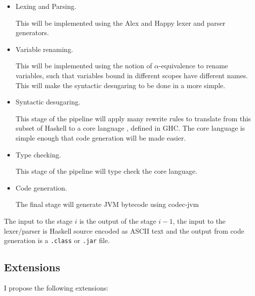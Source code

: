 \documentclass[a4paper]{article}
\begin{document}
  \begin{itemize}
    \item Lexing and Parsing.

      This will be implemented using the Alex and Happy lexer and parser generators.
    \item Variable renaming.

      This will be implemented using the notion of $\alpha$-equivalence to rename variables, such that variables bound in different scopes have different names.
      This will make the syntactic desugaring to be done in a more simple.
    \item Syntactic desugaring.

      This stage of the pipeline will apply many rewrite rules to translate from this subset of Haskell to a core language \cite{typedcorelink}, defined in GHC.
      The core language is simple enough that code generation will be made easier.
    \item Type checking.

     This stage of the pipeline will type check the core language.
    \item Code generation.

     The final stage will generate JVM bytecode using codec-jvm \cite{codec-jvm-link}
  \end{itemize}

  The input to the stage $i$ is the output of the stage $i-1$, the input to the lexer/parser is Haskell source encoded as ASCII text and the 
  output from code generation is a \texttt{.class} or \texttt{.jar} file.

  \subsection*{Extensions}

  I propose the following extensions:
\end{document}
